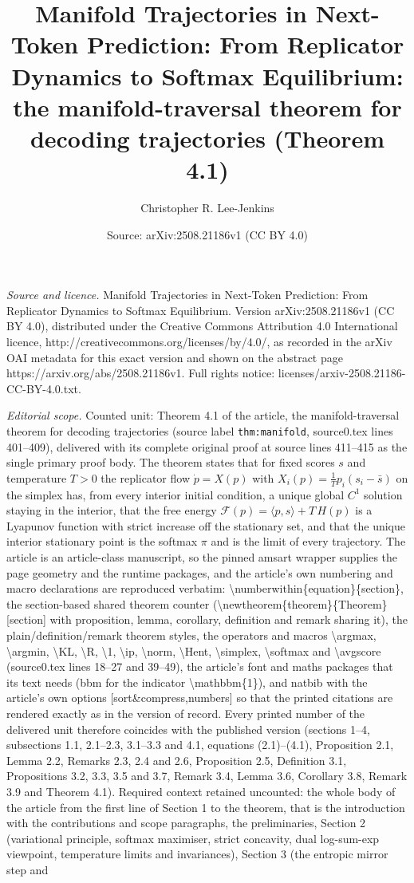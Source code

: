 \documentclass[10pt,a4paper]{amsart}
\title[Manifold Trajectories in Next-Token Prediction]{Manifold Trajectories in Next-Token Prediction: From Replicator Dynamics to Softmax Equilibrium: the manifold-traversal theorem for decoding trajectories (Theorem 4.1)}
\author{Christopher R. Lee-Jenkins}
\date{Source: arXiv:2508.21186v1 (CC BY 4.0)}
\numberwithin{equation}{section}
\theoremstyle{plain}
\theoremstyle{definition}
\theoremstyle{remark}
\newcommand{\1}{\mathbbm{1}}
\begin{document}
\maketitle
\noindent\emph{Source and licence.} Manifold Trajectories in Next-Token Prediction: From Replicator Dynamics to Softmax Equilibrium. Version arXiv:2508.21186v1 (CC BY 4.0), distributed under the Creative Commons Attribution 4.0 International licence, http://creativecommons.org/licenses/by/4.0/, as recorded in the arXiv OAI metadata for this exact version and shown on the abstract page https://arxiv.org/abs/2508.21186v1. Full rights notice: licenses/arxiv-2508.21186-CC-BY-4.0.txt.\par\smallskip
\noindent\textit{Editorial scope.} Counted unit: Theorem 4.1 of the article, the manifold-traversal theorem for decoding trajectories (source label \texttt{thm:manifold}, source0.tex lines 401--409), delivered with its complete original proof at source lines 411--415 as the single primary proof body. The theorem states that for fixed scores $s$ and temperature $T>0$ the replicator flow $\dot p=X(p)$ with $X_i(p)=\frac{1}{T}p_i(s_i-\bar s)$ on the simplex has, from every interior initial condition, a unique global $C^1$ solution staying in the interior, that the free energy $\mathcal{F}(p)=\langle p,s\rangle+T\,H(p)$ is a Lyapunov function with strict increase off the stationary set, and that the unique interior stationary point is the softmax $\pi$ and is the limit of every trajectory. The article is an article-class manuscript, so the pinned amsart wrapper supplies the page geometry and the runtime packages, and the article's own numbering and macro declarations are reproduced verbatim: \textbackslash{}numberwithin\{equation\}\{section\}, the section-based shared theorem counter (\textbackslash{}newtheorem\{theorem\}\{Theorem\}[section] with proposition, lemma, corollary, definition and remark sharing it), the plain/definition/remark theorem styles, the operators and macros \textbackslash{}argmax, \textbackslash{}argmin, \textbackslash{}KL, \textbackslash{}R, \textbackslash{}1, \textbackslash{}ip, \textbackslash{}norm, \textbackslash{}Hent, \textbackslash{}simplex, \textbackslash{}softmax and \textbackslash{}avgscore (source0.tex lines 18--27 and 39--49), the article's font and maths packages that its text needs (bbm for the indicator \textbackslash{}mathbbm\{1\}), and natbib with the article's own options [sort\&compress,numbers] so that the printed citations are rendered exactly as in the version of record. Every printed number of the delivered unit therefore coincides with the published version (sections 1--4, subsections 1.1, 2.1--2.3, 3.1--3.3 and 4.1, equations (2.1)--(4.1), Proposition 2.1, Lemma 2.2, Remarks 2.3, 2.4 and 2.6, Proposition 2.5, Definition 3.1, Propositions 3.2, 3.3, 3.5 and 3.7, Remark 3.4, Lemma 3.6, Corollary 3.8, Remark 3.9 and Theorem 4.1). Required context retained uncounted: the whole body of the article from the first line of Section 1 to the theorem, that is the introduction with the contributions and scope paragraphs, the preliminaries, Section 2 (variational principle, softmax maximiser, strict concavity, dual log-sum-exp viewpoint, temperature limits and invariances), Section 3 (the entropic mirror step and 
\end{document}
